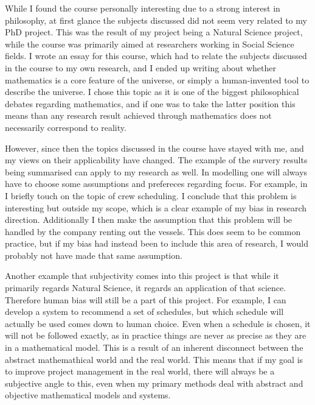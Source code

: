 \documentclass[a4paper,12pt]{article}
\begin{document}
While I found the course personally interesting due to a strong interest in philosophy, at first glance the subjects discussed did not seem very related to my PhD project. This was the result of my project being a Natural Science project, while the course was primarily aimed at researchers working in Social Science fields. I wrote an essay for this course, which had to relate the subjects discussed in the course to my own research, and I ended up writing about whether mathematics is a core feature of the universe, or simply a human-invented tool to describe the universe. I chose this topic as it is one of the biggest philosophical debates regarding mathematics, and if one was to take the latter position this means than any research result achieved through mathematics does not necessarily correspond to reality. 

However, since then the topics discussed in the course have stayed with me, and my views on their applicability have changed. The example of the survery results being summarised can apply to my research as well. In modelling one will always have to choose some assumptions and prefereces regarding focus. For example, in  I briefly touch on the topic of crew scheduling. I conclude that this problem is interesting but outside my scope, which is a clear example of my bias in research direction. Additionally I then make the assumption that this problem will be handled by the company renting out the vessels. This does seem to be common practice, but if my bias had instead been to include this area of research, I would probably not have made that same assumption. 

Another example that subjectivity comes into this project is that while it primarily regards Natural Science, it regards an application of that science. Therefore human bias will still be a part of this project. For example, I can develop a system to recommend a set of schedules, but which schedule will actually be used comes down to human choice. Even when a schedule is chosen, it will not be followed exactly, as in practice things are never as precise as they are in a mathematical model. This is a result of an inherent disconnect between the abstract mathemathical world and the real world. This means that if my goal is to improve project management in the real world, there will always be a subjective angle to this, even when my primary methods deal with abstract and objective mathematical models and systems. 
\end{document}
